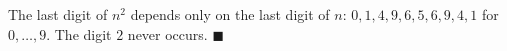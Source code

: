 The last digit of $n^2$ depends only on the last digit of $n$: $0,1,4,9,6,5,6,9,4,1$ for $0,\dots,9$. The digit $2$ never occurs. $\blacksquare$
